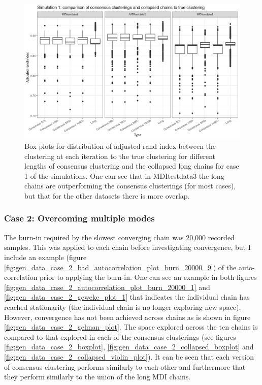 \documentclass[14pt]{extarticle} %
\begin{document}
		\begin{figure}[!htb]
			\centering
			\includegraphics[scale=0.65]{Images/Gen_data/Case_1/box_plot_ari_true_clustering_collapsed_long_burn_in.png}
			\caption{Box plots for distribution of adjusted rand index between the clustering at each iteration to the true clustering for different lengths of consensus clustering and the collapsed long chains for case 1 of the simulations. One can see that in MDItestdata3 the long chains are outperforming the consensus clusterings (for most cases), but that for the other datasets there is more overlap.}
			\label{fig:gen_data_case_1_collapsed_boxplot}
		\end{figure}
		

	
	\subsubsection{Case 2: Overcoming multiple modes} \label{sec:results:case_2}
	
	The burn-in required by the slowest converging chain was 20,000 recorded samples. This was applied to each chain before investigating convergence, but I include an example (figure \ref{fig:gen_data_case_2_bad_autocorrelation_plot_burn_20000_9}) of the auto-correlation prior to applying the burn-in. One can see an example in both figures \ref{fig:gen_data_case_2_autocorrelation_plot_burn_20000_1} and \ref{fig:gen_data_case_2_geweke_plot_1} that indicates the individual chain has reached stationarity (the individual chain is no longer exploring new space). However, convergence has not been achieved across chains as is shown in figure \ref{fig:gen_data_case_2_gelman_plot}. The space explored across the ten chains is compared to that explored in each of the consensus clusterings (see figures \ref{fig:gen_data_case_2_boxplot}, \ref{fig:gen_data_case_2_collapsed_boxplot} and \ref{fig:gen_data_case_2_collapsed_violin_plot}). It can be seen that each version of consensus clustering performs similarly to each other and furthermore that they perform similarly to the union of the long MDI chains.
	
\end{document}

